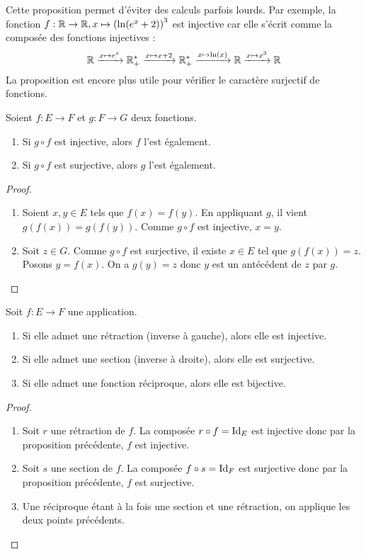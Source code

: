 \begin{exemple}
Cette proposition permet d'éviter des calculs parfois lourds. Par exemple, la fonction $f : \mathbb{R}\to \mathbb{R}, x\mapsto \left(\ln(e^x+2)\right)^3$ est injective car elle s'écrit comme la composée des fonctions injectives :
\[ \mathbb{R} \xrightarrow{x\mapsto e^x} \mathbb{R}_+^* \xrightarrow{x\mapsto x+2} \mathbb{R}_+^* \xrightarrow{x\mapsto \ln(x)} \mathbb{R} \xrightarrow{x\mapsto x^3}\mathbb{R}\]
La proposition est encore plus utile pour vérifier le caractère surjectif de fonctions.
\end{exemple}




\begin{proposition}
Soient $f : E\to F$ et $g : F\to G$ deux fonctions.
\begin{enumerate}
\item Si $g\circ f$ est injective, alors $f$ l'est également.
\item Si $g\circ f$ est surjective, alors $g$ l'est également.
\end{enumerate}
\end{proposition}
\begin{proof}
\begin{enumerate}
\item Soient $x, y\in E$ tels que $f(x)=f(y)$. En appliquant $g$, il vient $g(f(x))=g(f(y))$. Comme $g\circ f$ est injective, $x=y$.
\item Soit $z\in G$. Comme $g\circ f$ est surjective, il existe $x\in E$ tel que $g(f(x))=z$. Posons $y = f(x)$. On a $g(y)=z$ donc $y$ est un antécédent de $z$ par $g$.
\end{enumerate}
\end{proof}




\begin{corollaire}[de la proposition]\label{bijective-si-reciproque}
Soit $f : E\to F$ une application.
\begin{enumerate}
\item Si elle admet une rétraction (inverse à gauche), alors elle est injective.
\item Si elle admet une section (inverse à droite), alors elle est surjective.
\item Si elle admet une fonction réciproque, alors elle est bijective.
\end{enumerate}
\end{corollaire}
\begin{proof}
\begin{enumerate}
\item Soit $r$ une rétraction de $f$. La composée $r\circ f = \operatorname{Id}_E$ est injective donc par la proposition précédente, $f$ est injective.
\item Soit $s$ une section de $f$. La composée $f \circ s= \operatorname{Id}_F$ est surjective donc par la proposition précédente, $f$ est surjective.
\item Une réciproque étant à la fois une section et une rétraction, on applique les deux points précédents.
\end{enumerate}
\end{proof}



